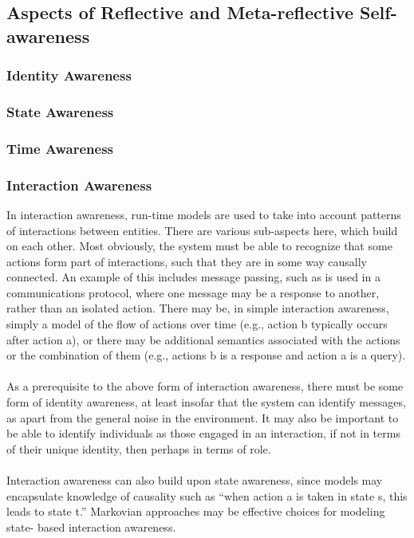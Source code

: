 \documentclass{article}
\begin{document}
			\subsection{Aspects of Reflective and Meta-reflective Self-awareness}
				\subsubsection{Identity Awareness}
				\subsubsection{State Awareness}
				\subsubsection{Time Awareness}
				\subsubsection{Interaction Awareness}In interaction awareness, run-time models are used to take into account patterns of interactions between entities. There are various sub-aspects here, which build on each
				other. Most obviously, the system must be able to recognize that some actions form part of interactions, such that they are in some way causally connected. An example of this includes message passing, such as is used in a communications protocol, where one message may be a response to another, rather than an isolated action.
				There may be, in simple interaction awareness, simply a model of the flow of actions over time (e.g., action b typically occurs after action a), or there may be additional semantics associated with the actions or the combination of them (e.g., actions b is a response and action a is a query).
					\paragraph{} As a prerequisite to the above form of interaction awareness, there must be some
					form of identity awareness, at least insofar that the system can identify messages,
					as apart from the general noise in the environment. It may also be important to be
					able to identify individuals as those engaged in an interaction, if not in terms of their
					unique identity, then perhaps in terms of role.
					\paragraph{} Interaction awareness can also build upon state awareness, since models may
					encapsulate knowledge of causality such as “when action a is taken in state s, this
					leads to state t.” Markovian approaches may be effective choices for modeling state-
					based interaction awareness.
\end{document}

